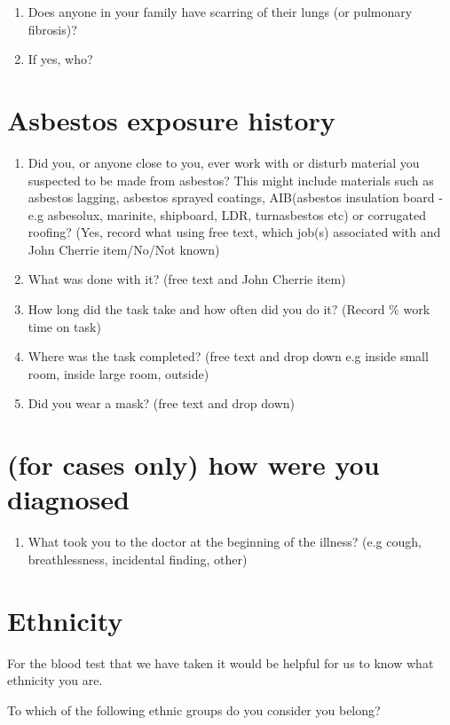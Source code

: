 \documentclass[a4paper,10pt]{article}
\begin{document}
\begin{enumerate}
    \item Does anyone in your family have scarring of their lungs (or pulmonary fibrosis)? 
\item If yes, who? 
\end{enumerate}

\section{Asbestos exposure history}

\begin{enumerate}
\item Did you, or anyone close to you, ever work with or disturb material you suspected to be made from asbestos? This might include materials such as asbestos lagging, asbestos sprayed coatings, AIB(asbestos insulation board - e.g asbesolux, marinite, shipboard, LDR, turnasbestos etc) or corrugated roofing? (Yes, record what using free text, which job(s) associated with and John Cherrie item/No/Not known)
\item What was done with it? (free text and John Cherrie item)
\item How long did the task take and how often did you do it? (Record \% work time on task)
\item Where was the task completed? (free text and drop down e.g inside small room, inside large room, outside)
\item Did you wear a mask? (free text and drop down)
\end{enumerate}

\section{(for cases only) how were you diagnosed}

\begin{enumerate}
    \item What took you to the doctor at the beginning of the illness? (e.g cough, breathlessness, incidental finding, other) 
\end{enumerate}

\section{Ethnicity}
For the blood test that we have taken it would be helpful for us to know what ethnicity you are.

To which of the following ethnic groups do you consider you belong?
\end{document}
